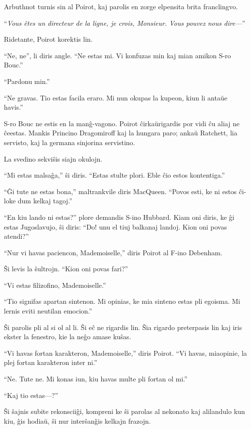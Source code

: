 Arbuthnot turnis sin al Poirot, kaj parolis en zorge elpensita brita franclingvo.

``\emph{Vous êtes un directeur de la ligne, je crois, Monsieur. Vous pouvez nous dire---}''

Ridetante, Poirot korektis lin.

``Ne, ne'', li diris angle. ``Ne estas mi. Vi konfuzas min kaj mian amikon S-ro Bouc.''

``Pardonu min.''

``Ne gravas. Tio estas facila eraro. Mi nun okupas la kupeon, kiun li antaŭe havis.''

S-ro Bouc ne estis en la manĝ-vagono. Poirot ĉirkaŭrigardis por vidi ĉu aliaj ne ĉeestas. Mankis Princino Dragomiroff kaj la hungara paro; ankaŭ Ratchett, lia servisto, kaj la germana sinjorina servistino.

La svedino sekviŝis siajn okulojn.

``Mi estas malsaĝa,'' ŝi diris. ``Estas stulte plori. Eble ĉio estos kontentiga.''

``Ĝi tute ne estas bona,'' maltrankvile diris MacQueen. ``Povos esti, ke ni estos ĉi-loke dum kelkaj tagoj.''

``En kiu lando ni estas?'' plore demandis S-ino Hubbard. Kiam oni diris, ke ĝi estas Jugoslavujo, ŝi diris: ``Do! unu el tiuj balkanaj landoj. Kion oni povas atendi?''

``Nur vi havas paciencon, Mademoiselle,'' diris Poirot al F-ino Debenham.

Ŝi levis la ŝultrojn. ``Kion oni povas fari?''

``Vi estas filizofino, Mademoiselle.''

``Tio signifas apartan sintenon. Mi opinias, ke mia sinteno estas pli egoisma. Mi lernis eviti neutilan emocion.''

Ŝi parolis pli al si ol al li. Ŝi eĉ ne rigardis lin. Ŝia rigardo preterpasis lin kaj iris ekster la fenestro, kie la neĝo amase kuŝas.

``Vi havas fortan karakteron, Mademoiselle,'' diris Poirot. ``Vi havas, miaopinie, la plej fortan karakteron inter ni.''

``Ne. Tute ne. Mi konas iun, kiu havas multe pli fortan ol mi.''

``Kaj tio estas---?''

Ŝi ŝajnis subite rekonsciiĝi, kompreni ke ŝi parolas al nekonato kaj alilandulo kun kiu, ĝis hodiaŭ, ŝi nur interŝanĝis kelkajn frazojn.

